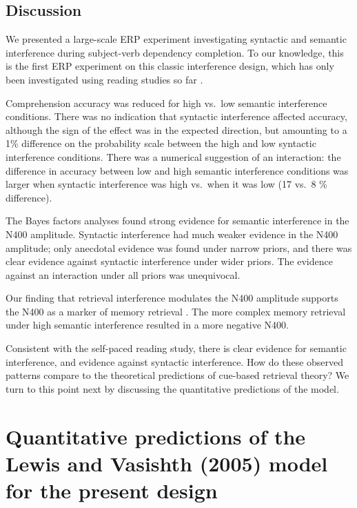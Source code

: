 \documentclass[a4paper, man, floatsintext]{apa7}
\begin{document}
\subsection{Discussion}
We presented a large-scale ERP experiment investigating syntactic and semantic interference during subject-verb dependency completion. To our knowledge, this is the first ERP experiment on this classic interference design, which has only been investigated using reading studies so far \parencite{mertzen,vandyke07}. 

Comprehension accuracy was reduced for high vs.\ low semantic interference conditions. There was no indication that syntactic interference affected accuracy, although the sign of the effect was in the expected direction, but  amounting to a 1\% difference on the probability scale between the high and low syntactic interference conditions. There was a numerical suggestion of an interaction: the difference in accuracy between low and high semantic interference conditions was larger when syntactic interference was high vs.\ when it was low (17 vs.\ 8 \% difference). 

The Bayes factors analyses found strong evidence for semantic interference in the N400 amplitude. Syntactic interference had much weaker evidence in the N400 amplitude; only anecdotal evidence was found under narrow priors, and there was clear evidence against syntactic interference under wider priors. The evidence against an interaction under all priors was unequivocal.

Our finding that retrieval interference modulates the N400 amplitude supports the N400 as a marker of memory retrieval \citep{kutas&federmeier_2000, kutas_federmeier2011, brouwer2017_n4_p6, lau2008_n400}. The more complex memory retrieval under high semantic interference resulted in a more negative N400.

Consistent with the self-paced reading study, there is clear evidence for semantic interference, and evidence against syntactic interference.  How do these observed patterns compare to the theoretical predictions of cue-based retrieval theory? We turn to this point next by discussing the quantitative predictions of the \textcite{Lewis2005} model.

\section{Quantitative predictions of the Lewis and Vasishth (2005) model for the present design}
\end{document}

